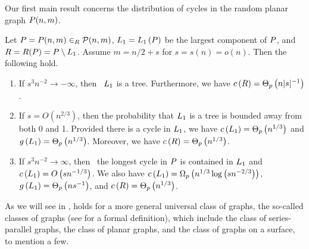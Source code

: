 Our first main result concerns the distribution of cycles in the random planar graph $P(n,m)$. 
\begin{thm}\label{CBthm:main1}
Let $P=P(n,m) \in_R \mathcal {P}(n,m)$, $L_1=L_1\left(P\right)$ be the largest component of $P$, and $R=R(P)=P \setminus L_1$. Assume $m=n/2+s$ for $s=s(n)=o\left(n\right)$. Then the following hold.
	\begin{enumerate}
		\item \label{CBthm:main1_a}
If $s^3 n^{-2} \to -\infty$, then \whp\ $L_1$ is a tree. Furthermore, we have $c\left({R}\right)=\Theta_p\left(n|s|^{-1}\right)$.
		\item \label{CBthm:main1_b}
		If $s=O\left(n^{2/3}\right)$, then the probability that $L_1$ is a tree is bounded away from both 0 and 1. Provided there is a cycle in $L_1$, we have $c\left({L_1}\right)=\Theta_p\left(n^{1/3}\right)$ and $g\left({L_1}\right)=\Theta_p\left(n^{1/3}\right)$. Moreover, we have $c\left({R}\right)=\Theta_p\left(n^{1/3}\right)$.
		\item \label{CBthm:main1_c}
		If $s^3 n^{-2} \to \infty$, then \whp\ the longest cycle in $P$ is contained in $L_1$ and $c\left({L_1}\right)=O\left(sn^{-1/3}\right)$.
		We also have $c\left({L_1}\right)=\Omega_p\left(n^{1/3}\log \left(sn^{-2/3}\right)\right)$, $g\left({L_1}\right)=\Theta_p\left(n s^{-1}\right)$, and $c\left({R}\right)=\Theta_p\left(n^{1/3}\right)$.
	\end{enumerate}	
\end{thm}
As we will see in ,  holds for a more general universal class of graphs, the so-called {\em \pl} classes of graphs (see  for a formal definition), which include the class of series-parallel graphs, the class of planar graphs, and the class of graphs on a surface, to mention a few.

